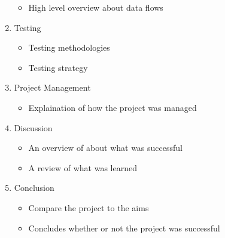 \begin{enumerate}
\begin{itemize}
            \item High level overview about data flows
        \end{itemize}
    \item Testing
        \begin{itemize}
            \item Testing methodologies
            \item Testing strategy
        \end{itemize}
    \item Project Management
        \begin{itemize}
            \item Explaination of how the project was managed
        \end{itemize}
    \item Discussion
        \begin{itemize}
            \item An overview of about what was successful
            \item A review of what was learned
        \end{itemize}
    \item Conclusion
        \begin{itemize}
            \item Compare the project to the aims
            \item Concludes whether or not the project was successful
        \end{itemize}
\end{enumerate}


